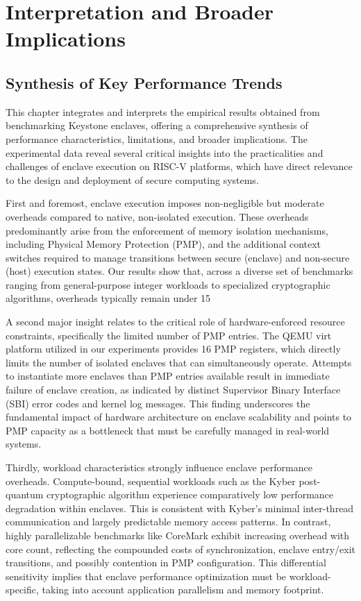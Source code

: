 \chapter{Interpretation and Broader Implications}
\label{chap:discussion}

\section{Synthesis of Key Performance Trends}
This chapter integrates and interprets the empirical results obtained from benchmarking Keystone enclaves, offering a comprehensive synthesis of performance characteristics, limitations, and broader implications. The experimental data reveal several critical insights into the practicalities and challenges of enclave execution on RISC-V platforms, which have direct relevance to the design and deployment of secure computing systems.

First and foremost, enclave execution imposes non-negligible but moderate overheads compared to native, non-isolated execution. These overheads predominantly arise from the enforcement of memory isolation mechanisms, including Physical Memory Protection (PMP), and the additional context switches required to manage transitions between secure (enclave) and non-secure (host) execution states. Our results show that, across a diverse set of benchmarks ranging from general-purpose integer workloads to specialized cryptographic algorithms, overheads typically remain under 15%

A second major insight relates to the critical role of hardware-enforced resource constraints, specifically the limited number of PMP entries. The QEMU virt platform utilized in our experiments provides 16 PMP registers, which directly limits the number of isolated enclaves that can simultaneously operate. Attempts to instantiate more enclaves than PMP entries available result in immediate failure of enclave creation, as indicated by distinct Supervisor Binary Interface (SBI) error codes and kernel log messages. This finding underscores the fundamental impact of hardware architecture on enclave scalability and points to PMP capacity as a bottleneck that must be carefully managed in real-world systems.

Thirdly, workload characteristics strongly influence enclave performance overheads. Compute-bound, sequential workloads such as the Kyber post-quantum cryptographic algorithm experience comparatively low performance degradation within enclaves. This is consistent with Kyber’s minimal inter-thread communication and largely predictable memory access patterns. In contrast, highly parallelizable benchmarks like CoreMark exhibit increasing overhead with core count, reflecting the compounded costs of synchronization, enclave entry/exit transitions, and possibly contention in PMP configuration. This differential sensitivity implies that enclave performance optimization must be workload-specific, taking into account application parallelism and memory footprint.

